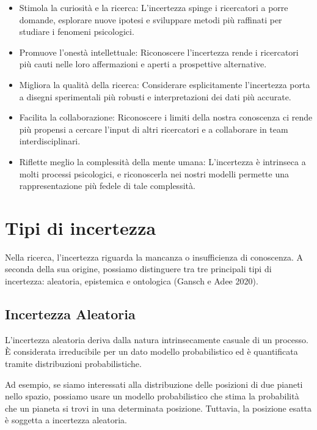 \documentclass[
  letterpaper,
  krantz2]{{[}./krantz{]}}
\providecommand{\tightlist}{%
  \setlength{\itemsep}{0pt}\setlength{\parskip}{0pt}}\usepackage{longtable,booktabs,array}
\begin{document}
\begin{itemize}
\tightlist
\item
  Stimola la curiosità e la ricerca: L'incertezza spinge i ricercatori a
  porre domande, esplorare nuove ipotesi e sviluppare metodi più
  raffinati per studiare i fenomeni psicologici.
\item
  Promuove l'onestà intellettuale: Riconoscere l'incertezza rende i
  ricercatori più cauti nelle loro affermazioni e aperti a prospettive
  alternative.
\item
  Migliora la qualità della ricerca: Considerare esplicitamente
  l'incertezza porta a disegni sperimentali più robusti e
  interpretazioni dei dati più accurate.
\item
  Facilita la collaborazione: Riconoscere i limiti della nostra
  conoscenza ci rende più propensi a cercare l'input di altri
  ricercatori e a collaborare in team interdisciplinari.
\item
  Riflette meglio la complessità della mente umana: L'incertezza è
  intrinseca a molti processi psicologici, e riconoscerla nei nostri
  modelli permette una rappresentazione più fedele di tale complessità.
\end{itemize}

\section{Tipi di incertezza}\label{tipi-di-incertezza}

Nella ricerca, l'incertezza riguarda la mancanza o insufficienza di
conoscenza. A seconda della sua origine, possiamo distinguere tra tre
principali tipi di incertezza: aleatoria, epistemica e ontologica
(Gansch e Adee 2020).

\subsection{Incertezza Aleatoria}\label{incertezza-aleatoria}

L'incertezza aleatoria deriva dalla natura intrinsecamente casuale di un
processo. È considerata irreducibile per un dato modello probabilistico
ed è quantificata tramite distribuzioni probabilistiche.

Ad esempio, se siamo interessati alla distribuzione delle posizioni di
due pianeti nello spazio, possiamo usare un modello probabilistico che
stima la probabilità che un pianeta si trovi in una determinata
posizione. Tuttavia, la posizione esatta è soggetta a incertezza
aleatoria.
\end{document}
